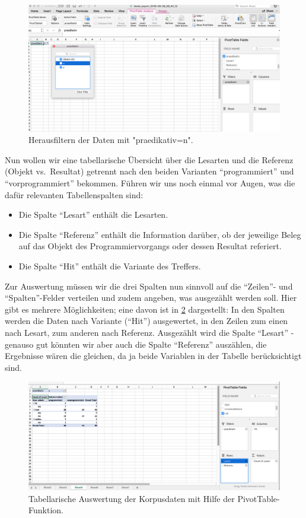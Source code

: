 \documentclass[]{article}
\providecommand{\tightlist}{%
  \setlength{\itemsep}{0pt}\setlength{\parskip}{0pt}}
\begin{document}
\begin{figure}
\includegraphics[width=6.28in]{docs/fig/praedikativ_filter} \caption{Herausfiltern der Daten mit "praedikativ=n".}\label{fig:praedikativfilter}
\end{figure}

Nun wollen wir eine tabellarische Übersicht über die Lesarten und die
Referenz (Objekt vs.~Resultat) getrennt nach den beiden Varianten
``programmiert'' und ``vorprogrammiert'' bekommen. Führen wir uns noch
einmal vor Augen, was die dafür relevanten Tabellenspalten sind:

\begin{itemize}
\tightlist
\item
  Die Spalte ``Lesart'' enthält die Lesarten.
\item
  Die Spalte ``Referenz'' enthält die Information darüber, ob der
  jeweilige Beleg auf das Objekt des Programmiervorgangs oder dessen
  Resultat referiert.
\item
  Die Spalte ``Hit'' enthält die Variante des Treffers.
\end{itemize}

Zur Auswertung müssen wir die drei Spalten nun sinnvoll auf die
``Zeilen''- und ``Spalten''-Felder verteilen und zudem angeben, was
ausgezählt werden soll. Hier gibt es mehrere Möglichkeiten; eine davon
ist in \ref{fig:excelfilter} dargestellt: In den Spalten werden die
Daten nach Variante (``Hit'') ausgewertet, in den Zeilen zum einen nach
Lesart, zum anderen nach Referenz. Ausgezählt wird die Spalte ``Lesart''
- genauso gut könnten wir aber auch die Spalte ``Referenz'' auszählen,
die Ergebnisse wären die gleichen, da ja beide Variablen in der Tabelle
berücksichtigt sind.

\begin{figure}
\includegraphics[width=6.36in]{docs/fig/excel_allfilters} \caption{Tabellarische Auswertung der Korpusdaten mit Hilfe der PivotTable-Funktion.}\label{fig:excelfilter}
\end{figure}
\end{document}
